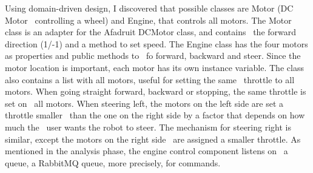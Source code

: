 Using domain-driven design, I discovered that possible classes are Motor (DC Motor \
controlling a wheel) and Engine, that controls all motors.
The Motor class is an adapter for the Afadruit DCMotor class, and contains \
the forward direction (1/-1) and a method to set speed.
The Engine class has the four motors as properties and public methods to \
fo forward, backward and steer.
Since the motor location is important, each motor has its own instance variable.
The class also contains a list with all motors, useful for setting the same \
throttle to all motors.
When going straight forward, backward or stopping, the same throttle is set on \
all motors.
When steering left, the motors on the left side are set a throttle smaller \
than the one on the right side by a factor that depends on how much the \
user wants the robot to steer.
The mechanism for steering right is similar, except the motors on the right side \
are assigned a smaller throttle.
As mentioned in the analysis phase, the engine control component listens on \
a queue, a RabbitMQ queue, more precisely, for commands.

